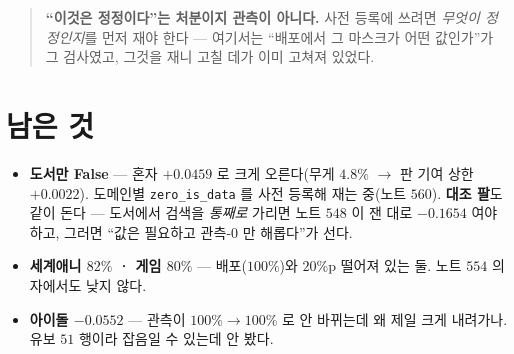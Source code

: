 \documentclass[11pt]{article}
\begin{document}
\begin{quote}
\textbf{``이것은 정정이다''는 처분이지 관측이 아니다.} 사전 등록에 쓰려면
\emph{무엇이 정정인지}를 먼저 재야 한다 --- 여기서는 ``배포에서 그 마스크가
어떤 값인가''가 그 검사였고, 그것을 재니 고칠 데가 이미 고쳐져 있었다.
\end{quote}

\section*{남은 것}

\begin{itemize}
\item \textbf{도서만 False} --- 혼자 $+0.0459$ 로 크게 오른다(무게 $4.8\%$
$\to$ 판 기여 상한 $+0.0022$). 도메인별 \texttt{zero\_is\_data} 를 사전
등록해 재는 중(노트 $560$). \textbf{대조 팔}도 같이 돈다 --- 도서에서 검색을
\emph{통째로} 가리면 노트 $548$ 이 잰 대로 $-0.1654$ 여야 하고, 그러면
``값은 필요하고 관측-$0$ 만 해롭다''가 선다.
\item \textbf{세계애니 $82\%$ · 게임 $80\%$} --- 배포($100\%$)와 $20$\%p
떨어져 있는 둘. 노트 $554$ 의 자에서도 낮지 않다.
\item \textbf{아이돌 $-0.0552$} --- 관측이 $100\% \to 100\%$ 로 안 바뀌는데
왜 제일 크게 내려가나. 유보 $51$ 행이라 잡음일 수 있는데 안 봤다.
\end{itemize}
\end{document}
